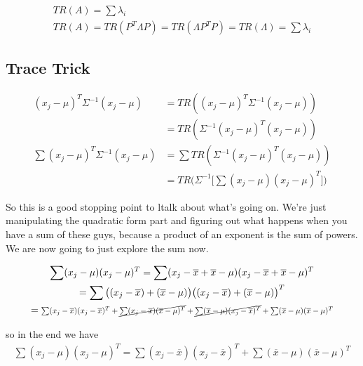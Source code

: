 \begin{gather*}
    TR(A) = \sum \lambda_i \\
    TR(A) = TR(P^T\Lambda P) = TR(\Lambda P^TP)=TR(\Lambda)=\sum\lambda_i
\end{gather*}

\subsection{Trace Trick}
\begin{align*}
    (x_j-\mu)^T\Sigma^{-1}(x_j-\mu) &= TR((x_j-\mu)^T\Sigma^{-1}(x_j-\mu))\\
    &=TR(\Sigma^{-1}(x_j-\mu)^T(x_j-\mu))\\
    \sum (x_j-\mu)^T\Sigma^{-1}(x_j-\mu) &= \sum TR(\Sigma^{-1}(x_j-\mu)^T(x_j-\mu))\\
    &=
    TR\Bigg(\Sigma^{-1}\bigg[\sum(x_j-\mu)(x_j-\mu)^T\bigg]\Bigg)
\end{align*}

So this is a good stopping point to ltalk about what's going on. We're just manipulating the quadratic form part and figuring out what happens when you have a sum of these guys, because a product of an exponent is the sum of powers.
We are now going to just explore the sum now.

\begin{gather*}
    \sum(x_j-\mu)(x_j-\mu)^T = \sum(x_j-\overline{x}+\overline{x}-\mu)(x_j-\overline{x}+\overline{x}-\mu)^T\\
    = \sum \big((x_j-\overline{x})+(\overline{x}-\mu) \big) \big((x_j-\overline{x})+(\overline{x}-\mu) \big)^T\\
    = \scalebox{0.8}{$
    \sum(x_j-\overline{x})(x_j-\overline{x})^T
    + \cancel{\sum(x_j-\overline{x})(\overline{x}-\mu)^T}
    + \cancel{\sum(\overline{x}-\mu)(x_j-\overline{x})^T}
    + \sum (\overline{x}-\mu)(\overline{x}-\mu)^T $}
\end{gather*}

so in the end we have
\begin{gather*}
    \sum(x_j-\mu)(x_j-\mu)^T = \sum(x_j-\overline{x})(x_j-\overline{x})^T+\sum (\overline{x}-\mu)(\overline{x}-\mu)^T
\end{gather*}

